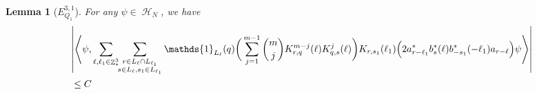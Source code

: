 \documentclass[sn-mathphys, Numbered ,a4paper]{sn-jnl}%
\DeclareMathOperator{\Z}{\mathbb{Z}}
\DeclareMathOperator{\HH}{\mathcal{H}}
\DeclareMathOperator{\NN}{\mathcal{N}}
\newcommand{\half}{\frac{1}{2}}
\newcommand{\eva}[1]{\left\langle #1 \right\rangle}
\theoremstyle{plain}
\newtheorem{lemma}[theorem]{Lemma}
\theoremstyle{definition}
\theoremstyle{remark}
\theoremstyle{plain}
\theoremstyle{definition}
\theoremstyle{remark}
\begin{document}
\begin{lemma}[$E_{Q_1}^{3,1}$]
	For any $\psi \in \HH_N$, we have
	\begin{align}
		&\abs{\eva{\psi, \sum\limits_{\ell, \ell_1\in \Z^3_*}\!\!
				\sum\limits_{\substack{r\in L_{\ell}\cap L_{\ell_1}\\s \in L_{\ell}, s_1\in L_{\ell_1}}}\mathds{1}_{L_\ell}(q) \bigg(\sum_{j=1}^{m-1}{{m}\choose j}K^{m-j}_{r,q}(\ell)K^{j}_{q,s}(\ell)\bigg)K_{r,s_1}(\ell_1)\Big( 2a^*_{r-\ell_1}b^*_{s}(\ell) b^*_{-s_1}(-\ell_1)a_{r-\ell} \Big)  \psi}}\nonumber\\
		&\leq C
	\end{align}
\end{lemma}
\end{document}
